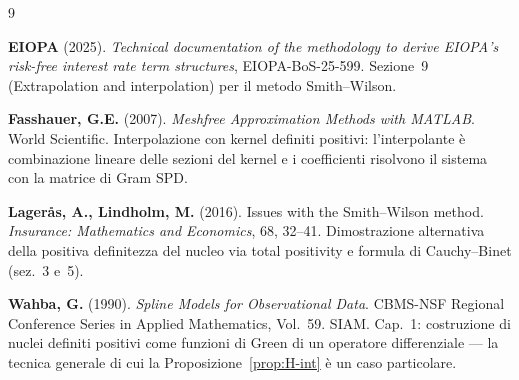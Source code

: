 \documentclass[11pt,a4paper]{article}
\theoremstyle{plain}
\theoremstyle{definition}
\theoremstyle{remark}
\begin{document}
\renewcommand{\refname}{Riferimenti bibliografici}
\begin{thebibliography}{9}

  \textbf{EIOPA} (2025).
  \textit{Technical documentation of the methodology to derive EIOPA's risk-free interest rate
  term structures}, EIOPA-BoS-25-599.
  Sezione~9 (Extrapolation and interpolation) per il metodo Smith--Wilson.

  \textbf{Fasshauer, G.E.} (2007).
  \textit{Meshfree Approximation Methods with MATLAB}. World Scientific.
  Interpolazione con kernel definiti positivi: l'interpolante è combinazione lineare delle
  sezioni del kernel e i coefficienti risolvono il sistema con la matrice di Gram SPD.

  \textbf{Lager\aa s, A., Lindholm, M.} (2016).
  Issues with the Smith--Wilson method.
  \textit{Insurance: Mathematics and Economics}, 68, 32--41.
  Dimostrazione alternativa della positiva definitezza del nucleo via total positivity e
  formula di Cauchy--Binet (sez.~3 e~5).

  \textbf{Wahba, G.} (1990).
  \textit{Spline Models for Observational Data}.
  CBMS-NSF Regional Conference Series in Applied Mathematics, Vol.~59. SIAM.
  Cap.~1: costruzione di nuclei definiti positivi come funzioni di Green di un operatore
  differenziale --- la tecnica generale di cui la Proposizione~\ref{prop:H-int} è un caso
  particolare.

\end{thebibliography}
\end{document}
